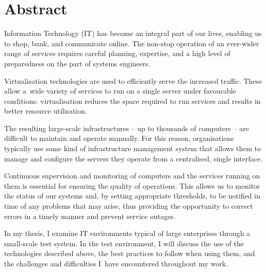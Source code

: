 \chapter*{Abstract}

Information Technology (IT) has become an integral part of our lives, enabling us to shop, bank, and communicate online. The non-stop operation of an ever-wider range of services requires careful planning, expertise, and a high level of preparedness on the part of systems engineers.

Virtualisation technologies are used to efficiently serve the increased traffic. These allow a~wide variety of services to run on a single server under favourable conditions: virtualisation reduces the space required to run services and results in better resource utilisation.

The resulting large-scale infrastructures -- up to thousands of computers -- are difficult to maintain and operate manually. For this reason, organisations typically use some kind of infrastructure management system that allows them to manage and configure the servers they operate from a centralised, single interface.

Continuous supervision and monitoring of computers and the services running on them is essential for ensuring the quality of operations. This allows us to monitor the status of our systems and, by setting appropriate thresholds, to be notified in time of any problems that may arise, thus providing the opportunity to correct errors in a timely manner and prevent service outages.

In my thesis, I examine IT environments typical of large enterprises through a small-scale test system. In the test environment, I will discuss the use of the technologies described above, the best practices to follow when using them, and the challenges and difficulties I~have encountered throughout my work.


\vfill
\selectthesislanguage

\setcounter{romanPage}{\value{page}}
